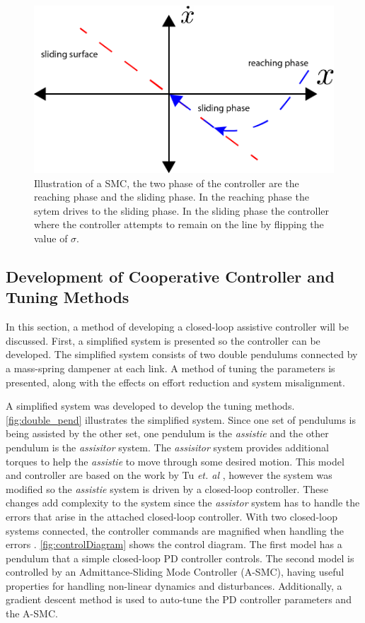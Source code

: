 \begin{figure}
    \centering
    \includegraphics[width=\linewidth]{images/controllers/SMC.png}
    \caption[Illustration of a SMC]{Illustration of a SMC, the two phase of the controller are the reaching phase and the sliding phase. In the reaching phase the sytem drives to the sliding phase. In the sliding phase the controller where the controller attempts to remain on the line by flipping the value of $\sigma$. }
    \label{fig:SMC}
\end{figure}

\subsection{Development of Cooperative Controller and Tuning Methods}

In this section, a method of developing a closed-loop assistive controller will be discussed. First, a simplified system is presented so the controller can be developed. The simplified system consists of two double pendulums connected by a mass-spring dampener at each link. A method of tuning the parameters is presented, along with the effects on effort reduction and system misalignment.

A simplified system was developed to develop the tuning methods. \autoref{fig:double_pend} illustrates the simplified system. Since one set of pendulums is being assisted by the other set, one pendulum is the \textit{assistie} and the other pendulum is the \textit{assisitor} system. The \textit{assisitor} system provides additional torques to help the \textit{assistie} to move through some desired motion. This model and controller are based on the work by Tu \textit{et. al} \cite{tu2020adaptive}, however the system was modified so the \textit{assistie} system is driven by a closed-loop controller. These changes add complexity to the system since the \textit{assistor} system has to handle the errors that arise in the attached closed-loop controller. With two closed-loop systems connected, the controller commands are magnified when handling the errors \cite{tu2020adaptive}. \autoref{fig:controlDiagram} shows the control diagram. The first model has a pendulum that a simple closed-loop PD controller controls. The second model is controlled by an Admittance-Sliding Mode Controller (A-SMC), having useful properties for handling non-linear dynamics and disturbances. Additionally, a gradient descent method is used to auto-tune the PD controller parameters and the A-SMC. 

